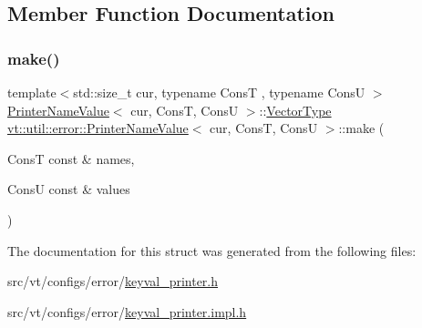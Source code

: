 \subsection{Member Function Documentation}
\mbox{\label{structvt_1_1util_1_1error_1_1_printer_name_value_ae17876bc298440df1aa7fc790823ff05}} 
\subsubsection{\texorpdfstring{make()}{make()}}
{\footnotesize\ttfamily template$<$std\+::size\+\_\+t cur, typename ConsT , typename ConsU $>$ \\
\hyperlink{structvt_1_1util_1_1error_1_1_printer_name_value}{Printer\+Name\+Value}$<$ cur, ConsT, ConsU $>$\+::\hyperlink{structvt_1_1util_1_1error_1_1_printer_name_value_a9fa3936ec282d02e03775d8a7c098678}{Vector\+Type} \hyperlink{structvt_1_1util_1_1error_1_1_printer_name_value}{vt\+::util\+::error\+::\+Printer\+Name\+Value}$<$ cur, ConsT, ConsU $>$\+::make (\begin{DoxyParamCaption}\item[{ConsT const \&}]{names,  }\item[{ConsU const \&}]{values }\end{DoxyParamCaption})\hspace{0.3cm}{\ttfamily [static]}}



The documentation for this struct was generated from the following files\+:\begin{DoxyCompactItemize}
\item 
src/vt/configs/error/\hyperlink{keyval__printer_8h}{keyval\+\_\+printer.\+h}\item 
src/vt/configs/error/\hyperlink{keyval__printer_8impl_8h}{keyval\+\_\+printer.\+impl.\+h}\end{DoxyCompactItemize}

